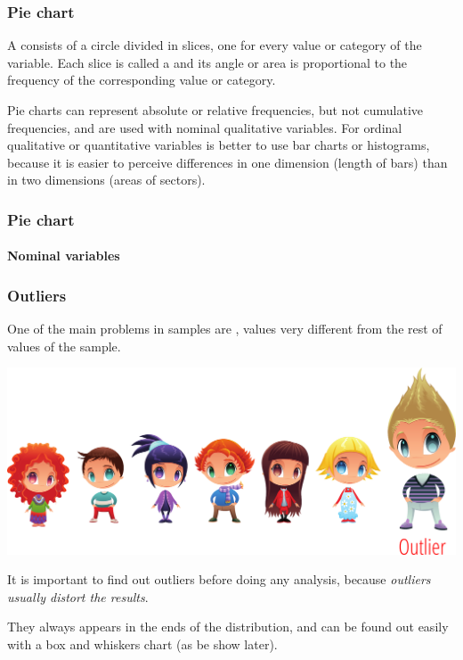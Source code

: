 \begin{frame}
\frametitle{Pie chart}
A  consists of a circle divided in slices, one for every value or category of the variable. 
Each slice is called a  and its angle or area is proportional to the frequency of the corresponding
value or category. 

Pie charts can represent absolute or relative frequencies, but not cumulative frequencies, and are used with nominal qualitative variables.
For ordinal qualitative or quantitative variables is better to use bar charts or histograms, because it is easier to perceive differences in one dimension (length of bars) than in two dimensions (areas of sectors).
\end{frame}


\begin{frame}
\frametitle{Pie chart}
\framesubtitle{Nominal variables}
\begin{center}
\scalebox{0.6}{}
\end{center}
\end{frame}


\begin{frame}
\frametitle{Outliers}
One of the main problems in samples are , values very different from the rest of values of the sample.
\begin{center}
\includegraphics[scale=0.5]{img/descriptive/outlier.png}
\end{center}

It is important to find out outliers before doing any analysis, because \alert{\emph{outliers usually distort the results}}.

They always appears in the ends of the distribution, and can be found out easily with a box and whiskers chart (as be show later).
\end{frame}


